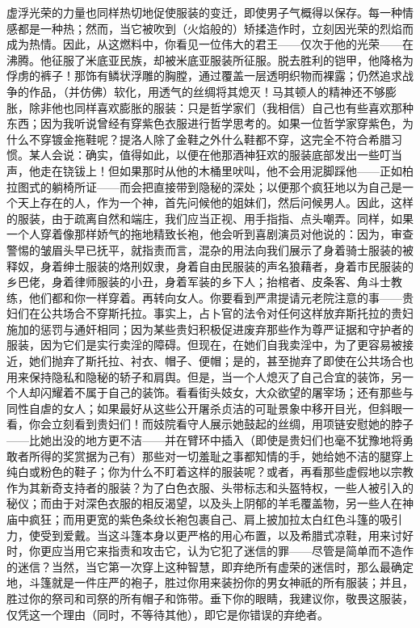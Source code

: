 虚浮光荣的力量也同样热切地促使服装的变迁，即使男子气概得以保存。每一种情感都是一种热；然而，当它被吹到（火焰般的）矫揉造作时，立刻因光荣的烈焰而成为热情。因此，从这燃料中，你看见一位伟大的君王——仅次于他的光荣——在沸腾。他征服了米底亚民族，却被米底亚服装所征服。脱去胜利的铠甲，他降格为俘虏的裤子！那饰有鳞状浮雕的胸膛，通过覆盖一层透明织物而裸露；仍然追求战争的作品，（并仿佛）软化，用透气的丝绸将其熄灭！马其顿人的精神还不够膨胀，除非他也同样喜欢膨胀的服装：只是哲学家们（我相信）自己也有些喜欢那种东西；因为我听说曾经有穿紫色衣服进行哲学思考的。如果一位哲学家穿紫色，为什么不穿镀金拖鞋呢？提洛人除了金鞋之外什么鞋都不穿，这完全不符合希腊习惯。某人会说：确实，值得如此，以便在他那酒神狂欢的服装底部发出一些叮当声，他走在铙钹上！但如果那时从他的木桶里吠叫，他不会用泥脚踩他——正如柏拉图式的躺椅所证——而会把直接带到隐秘的深处；以便那个疯狂地以为自己是一个天上存在的人，作为一个神，首先问候他的姐妹们，然后问候男人。因此，这样的服装，由于疏离自然和端庄，我们应当正视、用手指指、点头嘲弄。同样，如果一个人穿着像那样娇气的拖地精致长袍，他会听到喜剧演员对他说的：因为，审查警惕的皱眉头早已抚平，就指责而言，混杂的用法向我们展示了身着骑士服装的被释奴，身着绅士服装的烙刑奴隶，身着自由民服装的声名狼藉者，身着市民服装的乡巴佬，身着律师服装的小丑，身着军装的乡下人；抬棺者、皮条客、角斗士教练，他们都和你一样穿着。再转向女人。你要看到严肃提请元老院注意的事——贵妇们在公共场合不穿斯托拉。事实上，占卜官的法令对任何这样放弃斯托拉的贵妇施加的惩罚与通奸相同；因为某些贵妇积极促进废弃那些作为尊严证据和守护者的服装，因为它们是实行卖淫的障碍。但现在，在她们自我卖淫中，为了更容易被接近，她们抛弃了斯托拉、衬衣、帽子、便帽；是的，甚至抛弃了即使在公共场合也用来保持隐私和隐秘的轿子和肩舆。但是，当一个人熄灭了自己合宜的装饰，另一个人却闪耀着不属于自己的装饰。看看街头妓女，大众欲望的屠宰场；还有那些与同性自虐的女人；如果最好从这些公开屠杀贞洁的可耻景象中移开目光，但斜眼一看，你会立刻看到贵妇们！而妓院看守人展示她鼓起的丝绸，用项链安慰她的脖子——比她出没的地方更不洁——并在臂环中插入（即使是贵妇们也毫不犹豫地将勇敢者所得的奖赏据为己有）那些对一切羞耻之事都知情的手，她给她不洁的腿穿上纯白或粉色的鞋子；你为什么不盯着这样的服装呢？或者，再看那些虚假地以宗教作为其新奇支持者的服装？为了白色衣服、头带标志和头盔特权，一些人被引入的秘仪；而由于对深色衣服的相反渴望，以及头上阴郁的羊毛覆盖物，另一些人在神庙中疯狂；而用更宽的紫色条纹长袍包裹自己、肩上披加拉太白红色斗篷的吸引力，使受到爱戴。当这斗篷本身以更严格的用心布置，以及希腊式凉鞋，用来讨好时，你更应当用它来指责和攻击它，认为它犯了迷信的罪——尽管是简单而不造作的迷信？当然，当它第一次穿上这种智慧，即弃绝所有虚荣的迷信时，那么最确定地，斗篷就是一件庄严的袍子，胜过你用来装扮你的男女神祇的所有服装；并且，胜过你的祭司和司祭的所有帽子和饰带。垂下你的眼睛，我建议你，敬畏这服装，仅凭这一个理由（同时，不等待其他），即它是你错误的弃绝者。\par

